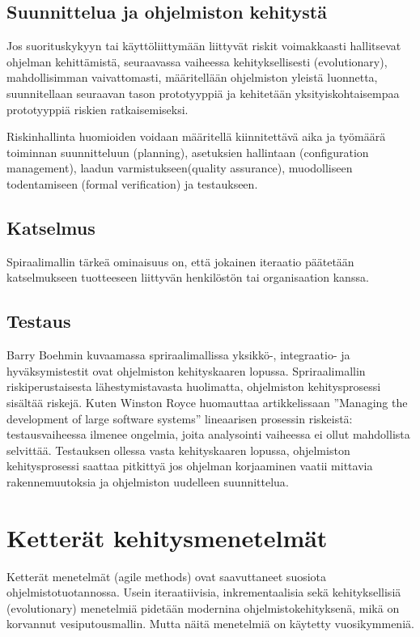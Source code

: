 \documentclass[finnish]{tktltiki2}
\theoremstyle{definition}
\theoremstyle{remark}
\begin{document}
\subsection*{Suunnittelua ja ohjelmiston kehitystä}

Jos suorituskykyyn tai käyttöliittymään liittyvät riskit voimakkaasti hallitsevat ohjelman kehittämistä, seuraavassa vaiheessa kehityksellisesti (evolutionary), mahdollisimman vaivattomasti, määritellään ohjelmiston yleistä luonnetta, suunnitellaan seuraavan tason prototyyppiä ja kehitetään yksityiskohtaisempaa prototyyppiä riskien ratkaisemiseksi\cite{BOE88}.

Riskinhallinta huomioiden voidaan määritellä kiinnitettävä aika ja työmäärä toiminnan suunnitteluun (planning), asetuksien hallintaan (configuration management), laadun varmistukseen(quality assurance), muodolliseen todentamiseen (formal verification) ja testaukseen\cite{BOE88}.

\subsection*{Katselmus}

Spiraalimallin tärkeä ominaisuus on, että jokainen iteraatio päätetään katselmukseen tuotteeseen liittyvän henkilöstön tai organisaation kanssa\cite{BOE88}.

\subsection*{Testaus}

Barry Boehmin kuvaamassa spriraalimallissa yksikkö-, integraatio- ja hyväksymis\-testit ovat ohjelmiston kehityskaaren lopussa. Spriraalimallin riskiperustaisesta lähestymistavasta huolimatta, ohjelmiston kehitysprosessi sisältää riskejä. Kuten Winston Royce huomauttaa artikkelissaan ''Managing the development of large software systems'' lineaarisen prosessin riskeistä: testausvaiheessa ilmenee ongelmia, joita analysointi vaiheessa ei ollut mahdollista selvittää. Testauksen ollessa vasta kehityskaaren lopussa, ohjelmiston kehitysprosessi saattaa pitkittyä jos ohjelman korjaaminen vaatii mittavia rakennemuutoksia ja ohjelmiston uudelleen suunnittelua\cite{ROY70}.

\section{Ketterät kehitysmenetelmät}

Ketterät menetelmät (agile methods) ovat saavuttaneet suosiota ohjelmistotuotannossa. Usein iteraatiivisia, inkrementaalisia sekä kehityksellisiä (evolutionary) menetelmiä pidetään modernina ohjelmistokehityksenä, mikä on korvannut vesiputousmallin. Mutta näitä menetelmiä on käytetty vuosikymmeniä\cite{LAB03}.
\end{document}
